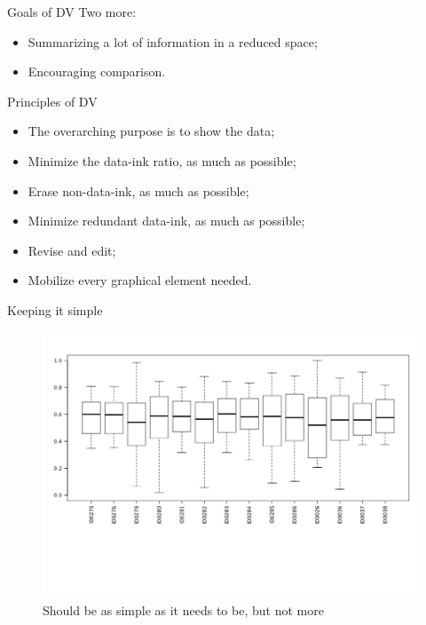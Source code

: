 \documentclass[12pt,english,pdf,dvipsnames,handout]{beamer}
\begin{document}
\begin{frame}{Goals of DV}
  Two more:

  \begin{itemize}
  \item Summarizing a lot of information in a reduced space;
  \pause
  \item Encouraging comparison.
  \end{itemize}
  
\end{frame}


\begin{frame}{Principles of DV \cite<adapted from>[]{Tufte2001}}

  \begin{itemize}
  \item The overarching purpose is to show the data;\bigskip
  \pause
  \item Minimize the data-ink ratio, as much as possible;\bigskip
  \pause
  \item Erase non-data-ink, as much as possible;\bigskip
  \pause
  \item Minimize redundant data-ink, as much as possible;\bigskip
  \pause
  \item Revise and edit;\bigskip
  \pause
  \item Mobilize every graphical element needed.
  \end{itemize}
  
\end{frame}


\begin{frame}{Keeping it simple}

\begin{figure}
	\centering
	\includegraphics[scale=0.40]{../04-graphs/29_Cluttered_boxplot}
	\caption{Should be as simple as it needs to be, but not more}
\end{figure}

\end{frame}
\end{document}

